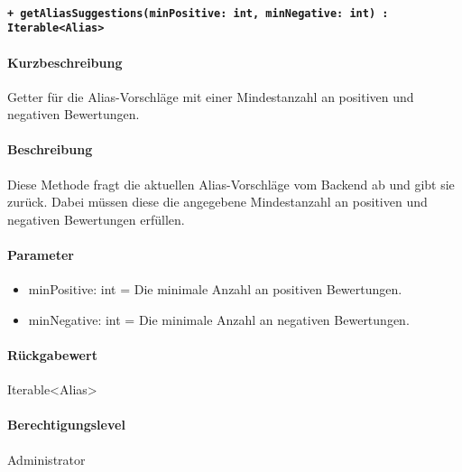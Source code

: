 \paragraph{\texttt{+ getAliasSuggestions(minPositive: int, minNegative: int) : Iterable<Alias>}}\label{AP_getAliasSuggestions}%
\paragraph*{Kurzbeschreibung}
Getter für die Alias-Vorschläge mit einer Mindestanzahl an positiven und negativen Bewertungen.
\paragraph*{Beschreibung}
Diese Methode fragt die aktuellen Alias-Vorschläge vom Backend ab und gibt sie zurück.
Dabei müssen diese die angegebene Mindestanzahl an positiven und negativen Bewertungen erfüllen.
\paragraph*{Parameter}
\begin{itemize}
    \item minPositive: int = Die minimale Anzahl an positiven Bewertungen.
    \item minNegative: int = Die minimale Anzahl an negativen Bewertungen.
\end{itemize}
\paragraph*{Rückgabewert}
Iterable<Alias>
\paragraph*{Berechtigungslevel}
Administrator